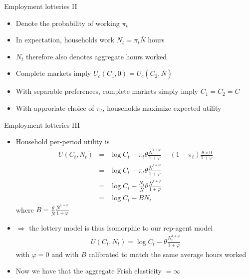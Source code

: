 \documentclass[9pt,xcolor={dvipsnames}]{beamer}
\newcommand{\bit}{\begin{itemize}}
\newcommand{\eit}{\end{itemize}}
\newcommand{\bc}{\color{blue}}
\begin{document}
\begin{frame}{Employment lotteries II}

\bit
\setlength\itemsep{1.5em}

\item Denote the probability of working $\pi_t$

\item In expectation, households work $N_t = \pi_t \bar N$ hours

\item $N_t$ therefore also denotes aggregate hours worked

\item Complete markets imply $U_c(C_1, 0) = U_c(C_2, \bar N)$

\item With separable preferences, complete markets simply imply $C_1=C_2=C$

\item With approriate choice of $\pi_t$, households maximize expected utility

\eit

\end{frame}


\begin{frame}{Employment lotteries III}

\bit
\setlength\itemsep{1.5em}

\item Household per-period utility is
\begin{eqnarray}
U(C_t, N_t) &=& \log C_t - \pi_t \theta \frac{\bar N^{1+\varphi}}{1+\varphi} - (1-\pi_t) \frac{\theta \times 0}{1+\varphi} \nonumber \\
&=& \log C_t - \pi_t \theta \frac{\bar N^{1+\varphi}}{1+\varphi}\nonumber \\
&=& \log C_t - \frac{N_t}{\bar N} \theta \frac{\bar N^{1+\varphi}}{1+\varphi} \nonumber \\
&=& \log C_t - B N_t \nonumber
\end{eqnarray}
where $B = \frac{\theta}{\bar N} \frac{\bar N^{1+\varphi}}{1+\varphi}$

\item $\Rightarrow$ the lottery model is thus {\bc isomorphic} to our rep-agent model
\begin{eqnarray}
U(C_t, N_t) = \log C_t - \theta \frac{N_t^{1+\varphi}}{1+\varphi}\nonumber 
\end{eqnarray}
with $\varphi = 0$ and with $B$ calibrated to match the same average hours worked

\item Now we have that the aggregate Frish elasticity $= \infty$


\eit

\end{frame}
\end{document}

